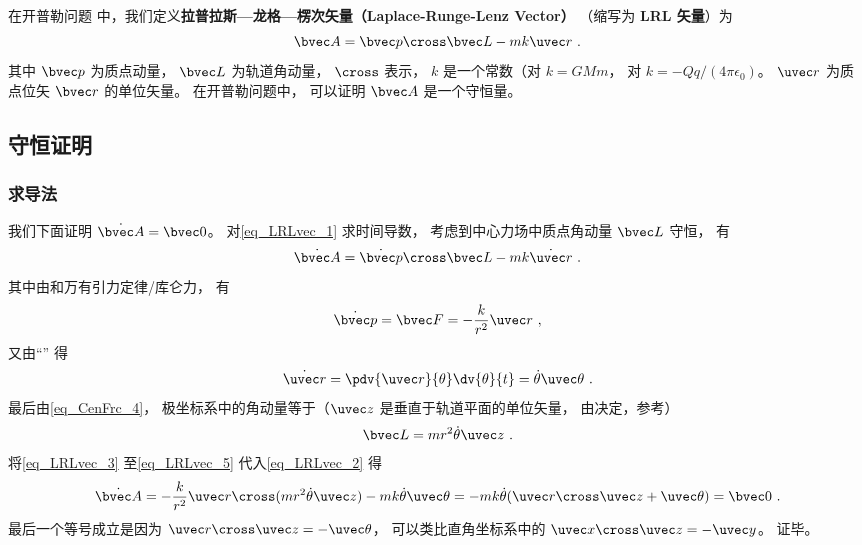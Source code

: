 

在开普勒问题%
中，我们定义\textbf{拉普拉斯—龙格—楞次矢量（Laplace-Runge-Lenz Vector）} （缩写为 \textbf{LRL 矢量}）为
\begin{equation}\label{eq_LRLvec_1}
\bvec A = \bvec p \cross \bvec L - mk \uvec r~.
\end{equation}
其中 $\bvec p$ 为质点动量， $\bvec L$ 为轨道角动量， $\cross$ 表示， $k$ 是一个常数（对 $k = GMm$， 对 $k = -Qq/(4\pi\epsilon_0)$。 $\uvec r$ 为质点位矢 $\bvec r$ 的单位矢量。 在开普勒问题中， 可以证明 $\bvec A$ 是一个守恒量。

\subsection{守恒证明}
\subsubsection{求导法}
我们下面证明 $\dot{\bvec A} = \bvec 0$。 对\autoref{eq_LRLvec_1} 求时间导数， 考虑到中心力场中质点角动量 $\bvec L$ 守恒， 有
\begin{equation}\label{eq_LRLvec_2}
\dot{\bvec A} = \dot{\bvec p}\cross \bvec L  - mk\dot{\uvec r}~.
\end{equation}
其中由和万有引力定律/库仑力， 有
\begin{equation}\label{eq_LRLvec_3}
\dot{\bvec p} = \bvec F = - \frac{k}{r^2}\uvec r~,
\end{equation}
又由“” 得
\begin{equation}\label{eq_LRLvec_4}
\dot{\uvec r} = \pdv{\uvec r}{\theta} \dv{\theta}{t} = \dot\theta\uvec \theta~.
\end{equation}
最后由\autoref{eq_CenFrc_4}， 极坐标系中的角动量等于（$\uvec z$ 是垂直于轨道平面的单位矢量， 由决定，参考）
\begin{equation}\label{eq_LRLvec_5}
\bvec L = mr^2\dot \theta \uvec z~.
\end{equation}
将\autoref{eq_LRLvec_3} 至\autoref{eq_LRLvec_5} 代入\autoref{eq_LRLvec_2} 得
\begin{equation}
\dot{\bvec A} = -\frac{k}{r^2}\uvec r \cross (mr^2\dot\theta\uvec z) - mk\dot\theta\uvec\theta
=-mk\dot\theta (\uvec r\cross \uvec z + \uvec \theta)
= \bvec 0~.
\end{equation}
最后一个等号成立是因为 $\uvec r\cross\uvec z = -\uvec\theta$， 可以类比直角坐标系中的 $\uvec x\cross\uvec z = -\uvec y$。 证毕。

